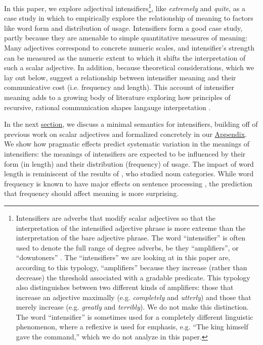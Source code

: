 \documentclass[10pt,letterpaper]{article}
\newcommand{\w}[1]{\emph{#1}}
\begin{document}
In this paper, we explore adjectival intensifiers\footnote{
Intensifiers are adverbs that modify scalar adjectives so that the interpretation of the intensified adjective phrase is more extreme than the interpretation of the bare adjective phrase.
The word ``intensifier'' is often used to denote the full range of degree adverbs, be they ``amplifiers'', or ``downtoners'' \cite{quirk}.
The ``intensifiers'' we are looking at in this paper are, according to this typology, ``amplifiers'' because they increase (rather than decrease) the threshold associated with a gradable predicate.
This typology also distinguishes between two different kinds of amplifiers: those that increase an adjective maximally (e.g. \w{completely} and \w{utterly}) and those that merely increase (e.g. \w{greatly} and \w{terribly}).
We do not make this distinction.
The word ``intensifier'' is sometimes used for a completely different linguistic phenomenon, where a reflexive is used for emphasis, e.g. ``The king himself gave the command,'' which we do not analyze in this paper. 
},
like \w{extremely} and \w{quite}, as a case study in which to empirically explore the relationship of meaning to factors like word form and distribution of usage.
Intensifiers form a good case study, partly because they are amenable to simple quantitative measures of meaning: Many adjectives correspond to concrete numeric scales, and intensifier's strength can be measured as the numeric extent to which it shifts the interpretation of such a scalar adjective. In addition, because theoretical considerations, which we lay out below, suggest a relationship between intensifier meaning and their communicative cost (i.e. frequency and length).
This account of intensifier meaning adds to a growing body of literature exploring how principles of recursive, rational communication shapes langauge interpretation \cite[e.g.]{grice_logic_1975, frank_predicting_2012, goodman_knowledge_2013, franke_quantity_2011, russell_probabilistic_2012, kao_nonliteral_2014, bergen_pragmatic_2014}.

In the next \hyperref[sec:semantics]{section}, we discuss a minimal semantics for intensifiers, building off of previous work on scalar adjectives and formalized concretely in our \hyperref[app:model]{Appendix}.
We show how pragmatic effects predict systematic variation in the meanings of intensifiers: the meanings of intensifiers are expected to be influenced by their form (in length) and their distribution (frequency) of usage.
The impact of word length is reminiscent of the results of , who studied noun categories.
While word frequency is known to have major effects on sentence processing \cite[e.g.]{levy_expectation-based_2008}, the prediction that frequency should affect meaning is more surprising.
\end{document}
